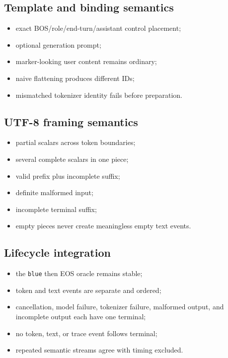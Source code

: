 \subsection{Template and binding
semantics}\label{template-and-binding-semantics}

\begin{itemize}
\tightlist
\item
  exact BOS/role/end-turn/assistant control placement;
\item
  optional generation prompt;
\item
  marker-looking user content remains ordinary;
\item
  naive flattening produces different IDs;
\item
  mismatched tokenizer identity fails before preparation.
\end{itemize}

\subsection{UTF-8 framing semantics}\label{utf-8-framing-semantics}

\begin{itemize}
\tightlist
\item
  partial scalars across token boundaries;
\item
  several complete scalars in one piece;
\item
  valid prefix plus incomplete suffix;
\item
  definite malformed input;
\item
  incomplete terminal suffix;
\item
  empty pieces never create meaningless empty text events.
\end{itemize}

\subsection{Lifecycle integration}\label{lifecycle-integration}

\begin{itemize}
\tightlist
\item
  the \texttt{blue} then EOS oracle remains stable;
\item
  token and text events are separate and ordered;
\item
  cancellation, model failure, tokenizer failure, malformed output, and
  incomplete output each have one terminal;
\item
  no token, text, or trace event follows terminal;
\item
  repeated semantic streams agree with timing excluded.
\end{itemize}

